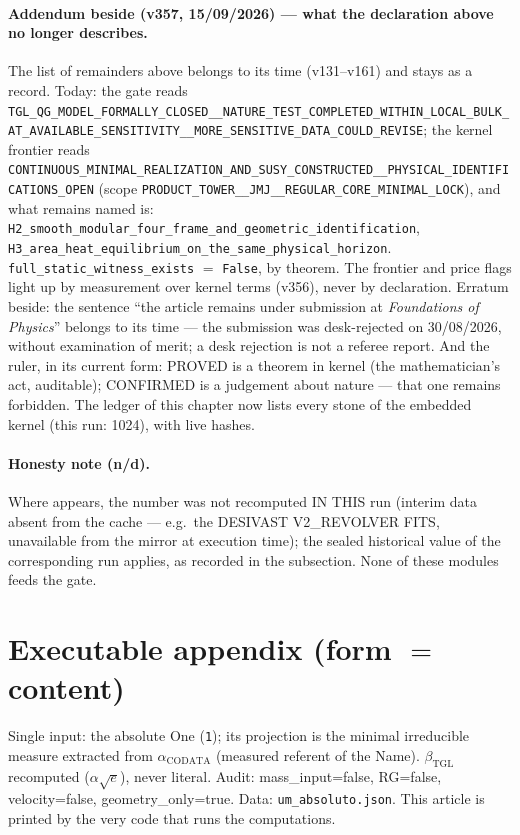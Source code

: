 \documentclass[11pt]{article}
\newcommand{\bTGL}{\beta_{\mathrm{TGL}}}\newcommand{\Msun}{M_{\odot}}\newcommand{\TGL}{\mathrm{TGL}}
\theoremstyle{definition}\newtheorem{deriv}{Derivation}
\begin{document}
\paragraph*{Addendum beside (v357, 15/09/2026) --- what the declaration above no longer describes.} The list of remainders above belongs to its time (v131--v161) and stays as a record. Today: the gate reads \texttt{TGL\_QG\_MODEL\_FORMALLY\_CLOSED\_\_NATURE\_TEST\_COMPLETED\_WITHIN\_LOCAL\_BULK\_AT\_AVAILABLE\_SENSITIVITY\_\_MORE\_SENSITIVE\_DATA\_COULD\_REVISE}; the kernel frontier reads \texttt{CONTINUOUS\_MINIMAL\_REALIZATION\_AND\_SUSY\_CONSTRUCTED\_\_PHYSICAL\_IDENTIFICATIONS\_OPEN} (scope \texttt{PRODUCT\_TOWER\_\_JMJ\_\_REGULAR\_CORE\_MINIMAL\_LOCK}), and what remains named is: \texttt{H2\_smooth\_modular\_four\_frame\_and\_geometric\_identification}, \texttt{H3\_area\_heat\_equilibrium\_on\_the\_same\_physical\_horizon}. \texttt{full\_static\_witness\_exists} $=$ \texttt{False}, by theorem. The frontier and price flags light up by measurement over kernel terms (v356), never by declaration. Erratum beside: the sentence ``the article remains under submission at \emph{Foundations of Physics}'' belongs to its time --- the submission was desk-rejected on 30/08/2026, without examination of merit; a desk rejection is not a referee report. And the ruler, in its current form: PROVED is a theorem in kernel (the mathematician's act, auditable); CONFIRMED is a judgement about nature --- that one remains forbidden. The ledger of this chapter now lists every stone of the embedded kernel (this run: 1024), with live hashes.

\paragraph{Honesty note (n/d).} Where  appears, the number was not recomputed IN THIS run (interim data absent from the cache --- e.g.\ the DESIVAST V2\_REVOLVER FITS, unavailable from the mirror at execution time); the sealed historical value of the corresponding run applies, as recorded in the subsection. None of these modules feeds the gate.

\section*{Executable appendix (form $=$ content)}

Single input: the absolute One (\texttt{1}); its projection is the minimal irreducible measure extracted from $\alpha_{\mathrm{CODATA}}$ (measured referent of the Name). $\bTGL$ recomputed ($\alpha\sqrt{e}$), never literal. Audit: mass\_input=false, RG=false, velocity=false, geometry\_only=true. Data: \texttt{um\_absoluto.json}. This article is printed by the very code that runs the computations.
\end{document}
